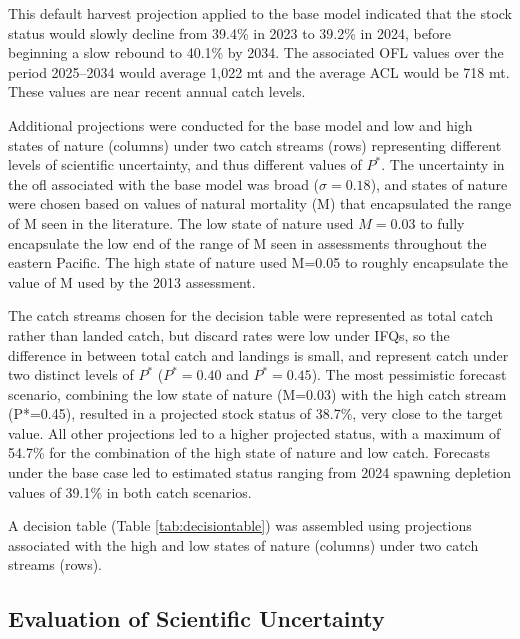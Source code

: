 \documentclass[11pt,
  letterpaper,
]{article}
\begin{document}
This default harvest projection applied to the base model indicated that the stock status would slowly decline from 39.4\% in 2023 to 39.2\% in 2024, before beginning a slow rebound to 40.1\% by 2034. The associated OFL values over the period 2025--2034 would average 1,022 mt and the average ACL would be 718 mt. These values are near recent annual catch levels.

Additional projections were conducted for the base model and low and high states of nature (columns) under two catch streams (rows) representing different levels of scientific uncertainty, and thus different values of \(P^*\). The uncertainty in the \gls{ofl} associated with the base model was broad (\(\sigma = 0.18\)), and states of nature were chosen based on values of natural mortality (M) that encapsulated the range of M seen in the literature. The low state of nature used \(M=0.03\) to fully encapsulate the low end of the range of M seen in assessments throughout the eastern Pacific. The high state of nature used M=0.05 to roughly encapsulate the value of M used by the 2013 assessment.

The catch streams chosen for the decision table were represented as total catch rather than landed catch, but discard rates were low under IFQs, so the difference in between total catch and landings is small, and represent catch under two distinct levels of \(P^*\) (\(P^*=0.40\) and \(P^*=0.45\)). The most pessimistic forecast scenario, combining the low state of nature (M=0.03) with the high catch stream (P*=0.45), resulted in a projected stock status of 38.7\%, very close to the target value. All other projections led to a higher projected status, with a maximum of 54.7\% for the combination of the high state of nature and low catch. Forecasts under the base case led to estimated status ranging from 2024 spawning depletion values of 39.1\% in both catch scenarios.

A decision table (Table \ref{tab:decisiontable}) was assembled using projections associated with the high and low states of nature (columns) under two catch streams (rows).

\hypertarget{evaluation-of-scientific-uncertainty}{%
\subsection{Evaluation of Scientific Uncertainty}\label{evaluation-of-scientific-uncertainty}}
\end{document}
